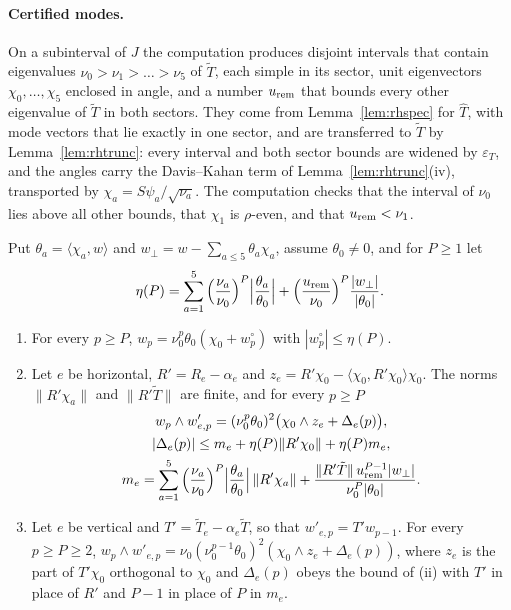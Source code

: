 \paragraph{Certified modes.}
On a subinterval of $J$ the computation produces disjoint intervals that contain eigenvalues $\nu_0>\nu_1>\dots>\nu_5$ of $\tilde T$, each simple in its
sector, unit eigenvectors $\chi_0,\dots,\chi_5$ enclosed in angle, and a number $u_{\rm rem}$ that bounds every other eigenvalue of $\tilde T$ in both
sectors. They come from Lemma~\ref{lem:rhspec} for $\hat T$, with mode vectors that lie exactly in one sector, and are transferred to $\tilde T$ by
Lemma~\ref{lem:rhtrunc}: every interval and both sector bounds are widened by $\varepsilon_T$, and the angles carry the Davis--Kahan term of
Lemma~\ref{lem:rhtrunc}(iv), transported by $\chi_a=S\psi_a/\sqrt{\nu_a}$. The computation checks that the interval of $\nu_0$ lies above all other
bounds, that $\chi_1$ is $\rho$-even, and that
$u_{\rm rem}<\nu_1$.

\begin{lemma}\label{lem:rhinf}
Put $\theta_a=\langle\chi_a,w\rangle$ and $w_\perp=w-\sum_{a\le5}\theta_a\chi_a$, assume $\theta_0\ne0$, and for $P\ge1$ let
\[
\eta(P)=\sum_{a=1}^5\Big(\frac{\nu_a}{\nu_0}\Big)^P\Big|\frac{\theta_a}{\theta_0}\Big|+\Big(\frac{u_{\rm rem}}{\nu_0}\Big)^P\frac{|w_\perp|}{|\theta_0|}.
\]
\begin{enumerate}
\item[(i)] For every $p\ge P$, $w_p=\nu_0^p\theta_0(\chi_0+w^\circ_p)$ with $|w^\circ_p|\le\eta(P)$.
\item[(ii)] Let $e$ be horizontal, $R'=R_e-\alpha_e$ and $z_e=R'\chi_0-\langle\chi_0,R'\chi_0\rangle\chi_0$. The norms $\|R'\chi_a\|$ and $\|R'\tilde T\|$ are
finite, and for every $p\ge P$
\begin{gather*}
w_p\wedge w'_{e,p}=(\nu_0^p\theta_0)^2\big(\chi_0\wedge z_e+\Delta_e(p)\big),\\
|\Delta_e(p)|\le m_e+\eta(P)\|R'\chi_0\|+\eta(P)m_e,\\
m_e=\sum_{a=1}^5\Big(\frac{\nu_a}{\nu_0}\Big)^P\Big|\frac{\theta_a}{\theta_0}\Big|\,\|R'\chi_a\|+\frac{\|R'\tilde T\|\,u_{\rm rem}^{P-1}|w_\perp|}{\nu_0^P|\theta_0|}.
\end{gather*}
\item[(iii)] Let $e$ be vertical and $T'=\tilde T_e-\alpha_e\tilde T$, so that $w'_{e,p}=T'w_{p-1}$. For every $p\ge P\ge2$,
$w_p\wedge w'_{e,p}=\nu_0(\nu_0^{p-1}\theta_0)^2(\chi_0\wedge z_e+\Delta_e(p))$, where $z_e$ is the part of $T'\chi_0$ orthogonal to $\chi_0$ and
$\Delta_e(p)$ obeys the bound of (ii) with $T'$ in place of $R'$ and $P-1$ in place of $P$ in $m_e$.
\end{enumerate}
\end{lemma}

